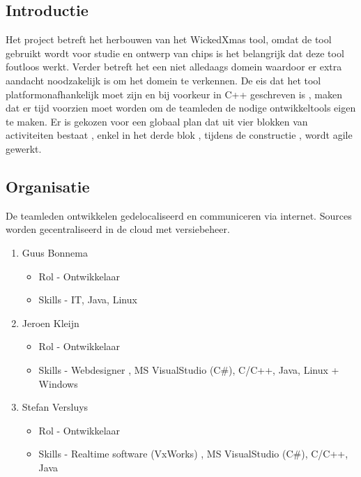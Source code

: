 
\subsection{Introductie}
Het project betreft het herbouwen van het WickedXmas tool, omdat de tool gebruikt wordt voor studie en ontwerp van chips is het belangrijk dat deze tool foutloos werkt. Verder betreft het een niet alledaags domein waardoor er extra aandacht noodzakelijk is om het domein te verkennen. De eis dat het tool platformonafhankelijk moet zijn en bij voorkeur in C++ geschreven is , maken dat er tijd voorzien moet worden om de teamleden de nodige ontwikkeltools eigen te maken. 
Er is gekozen voor een globaal plan dat uit vier blokken van activiteiten bestaat , enkel in het derde blok , tijdens de constructie , wordt agile gewerkt.

\subsection{Organisatie}
 De teamleden ontwikkelen gedelocaliseerd en communiceren via internet. Sources worden gecentraliseerd in de cloud met versiebeheer.
 \begin{enumerate}
 	\item Guus Bonnema
 	\begin{itemize}
		\item Rol - Ontwikkelaar
		\item Skills - IT, Java, Linux
	\end{itemize}
 	\item Jeroen Kleijn
 	\begin{itemize}
		\item Rol - Ontwikkelaar
		\item Skills - Webdesigner , MS VisualStudio (C\#), C/C++, Java, Linux + Windows
	\end{itemize}
 	\item Stefan Versluys
 	\begin{itemize}
		\item Rol - Ontwikkelaar
		\item Skills - Realtime software (VxWorks) , MS VisualStudio (C\#), C/C++, Java
	\end{itemize}
 \end{enumerate}
 
